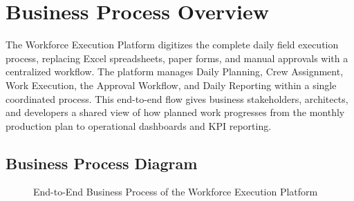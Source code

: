 \documentclass[11pt]{article}
\begin{document}
\section{Business Process Overview}

The Workforce Execution Platform digitizes the complete daily field execution
process, replacing Excel spreadsheets, paper forms, and manual approvals with a
centralized workflow. The platform manages Daily Planning, Crew Assignment,
Work Execution, the Approval Workflow, and Daily Reporting within a single
coordinated process. This end-to-end flow gives business stakeholders,
architects, and developers a shared view of how planned work progresses from
the monthly production plan to operational dashboards and KPI reporting.

\subsection{Business Process Diagram}

\begin{figure}[htbp]
    \centering
    \caption{End-to-End Business Process of the Workforce Execution Platform}
    \label{fig:business-process-overview}
\end{figure}
\end{document}
